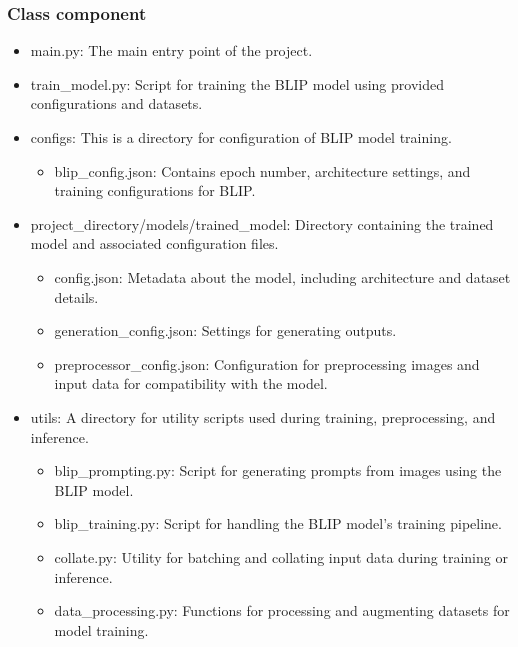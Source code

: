 \documentclass[conference]{IEEEtran}
\begin{document}
\subsubsection{Class component}
\begin{itemize}
    \item main.py: The main entry point of the project. \\
    \item train\_model.py: Script for training the BLIP model using provided configurations and datasets. \\
    \item configs: This is a directory for configuration of BLIP model training.
    \begin{itemize}
        \item blip\_config.json: Contains epoch number, architecture settings, and training configurations for BLIP. \\
    \end{itemize}
    \item project\_directory/models/trained\_model: Directory containing the trained model and associated configuration files.
    \begin{itemize}
        \item config.json: Metadata about the model, including architecture and dataset details. \\
        \item generation\_config.json: Settings for generating outputs. \\
        \item preprocessor\_config.json: Configuration for preprocessing images and input data for compatibility with the model. \\
    \end{itemize}
    \item utils: A directory for utility scripts used during training, preprocessing, and inference.
    \begin{itemize}
        \item blip\_prompting.py: Script for generating prompts from images using the BLIP model. \\
        \item blip\_training.py: Script for handling the BLIP model's training pipeline. \\
        \item collate.py: Utility for batching and collating input data during training or inference. \\
        \item data\_processing.py: Functions for processing and augmenting datasets for model training. \\
    \end{itemize}
\end{itemize}
\end{document}

